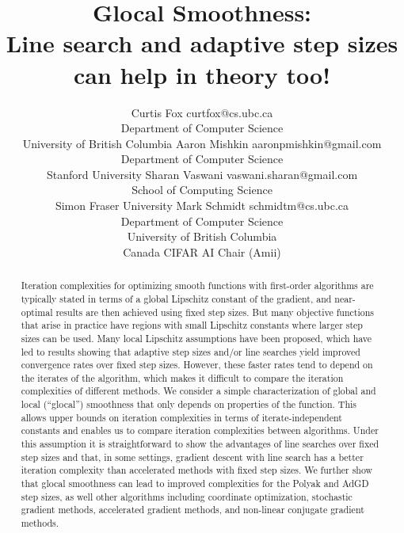 \documentclass[10pt]{article} %
\title{Glocal Smoothness:\\ Line search and adaptive step sizes can help in theory too!}
\author{\name Curtis Fox \email curtfox@cs.ubc.ca \\
      \addr Department of Computer Science\\
      University of British Columbia
      \AND
      \name Aaron Mishkin \email aaronpmishkin@gmail.com \\
      \addr Department of Computer Science\\
      Stanford University
      \AND
      \name Sharan Vaswani \email vaswani.sharan@gmail.com \\
      \addr School of Computing Science\\
      Simon Fraser University
      \AND Mark Schmidt \email schmidtm@cs.ubc.ca \\
      \addr Department of Computer Science\\
      University of British Columbia\\
      Canada CIFAR AI Chair (Amii)}
\begin{document}
\maketitle

\begin{abstract}
    Iteration complexities for optimizing smooth functions with first-order algorithms are typically stated in terms of a global Lipschitz constant of the gradient, and near-optimal results are then achieved using fixed step sizes. But many objective functions that arise in practice have regions with small Lipschitz constants where larger step sizes can be used. Many local Lipschitz assumptions have been proposed, which have led to results showing that adaptive step sizes and/or line searches yield improved convergence rates over fixed step sizes. However, these faster rates tend to depend on the iterates of the algorithm, which makes it difficult to compare the iteration complexities of different methods. We consider a simple characterization of global and local (``glocal'') smoothness that only depends on properties of the function. This allows upper bounds on iteration complexities in terms of iterate-independent constants and enables us to compare iteration complexities between algorithms. Under this assumption it is straightforward to show the advantages of line searches over fixed step sizes and that, in some settings, gradient descent with line search has a better iteration complexity than accelerated methods with fixed step sizes. We further show that glocal smoothness can lead to improved complexities for the Polyak and AdGD step sizes, as well other algorithms including coordinate optimization, stochastic gradient methods, accelerated gradient methods, and non-linear conjugate gradient methods.
\end{abstract}
\end{document}
